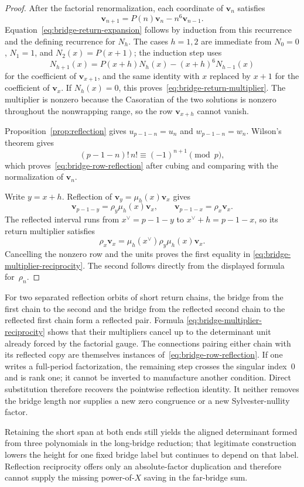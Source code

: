 \begin{proof}
After the factorial renormalization, each coordinate of $\mathbf v_n$
satisfies
\[
 \mathbf v_{n+1}=P(n)\mathbf v_n-n^6\mathbf v_{n-1}.
\]
Equation~\eqref{eq:bridge-return-expansion} follows by induction from this
recurrence and the defining recurrence for $N_h$.  The cases $h=1,2$ are
immediate from $N_0=0$, $N_1=1$, and $N_2(x)=P(x+1)$; the induction step
uses
\[
 N_{h+1}(x)=P(x+h)N_h(x)-(x+h)^6N_{h-1}(x)
\]
for the coefficient of $\mathbf v_{x+1}$, and the same identity with
$x$ replaced by $x+1$ for the coefficient of $\mathbf v_x$.
If $N_h(x)=0$, this proves~\eqref{eq:bridge-return-multiplier}.
The multiplier is nonzero because the Casoratian of the two solutions is
nonzero throughout the nonwrapping range, so the row $\mathbf v_{x+h}$
cannot vanish.

Proposition~\ref{prop:reflection} gives
$u_{p-1-n}=u_n$ and $w_{p-1-n}=w_n$.  Wilson's theorem gives
\[
 (p-1-n)!\,n!\equiv(-1)^{n+1}\pmod p,
\]
which proves~\eqref{eq:bridge-row-reflection} after cubing and comparing
with the normalization of $\mathbf v_n$.

Write $y=x+h$.  Reflection of
$\mathbf v_y=\mu_h(x)\mathbf v_x$ gives
\[
 \mathbf v_{p-1-y}=\rho_y\mu_h(x)\mathbf v_x,
 \qquad
 \mathbf v_{p-1-x}=\rho_x\mathbf v_x.
\]
The reflected interval runs from $x^\vee=p-1-y$ to
$x^\vee+h=p-1-x$, so its return multiplier satisfies
\[
 \rho_x\mathbf v_x
 =\mu_h(x^\vee)\rho_y\mu_h(x)\mathbf v_x.
\]
Cancelling the nonzero row and the units proves the first equality in
\eqref{eq:bridge-multiplier-reciprocity}.  The second follows directly
from the displayed formula for~$\rho_n$.
\end{proof}

\begin{remark}
\label{rem:bridge-full-cycle-tautology}
For two separated reflection orbits of short return chains, the bridge from
the first chain to the second and the bridge from the reflected second chain
to the reflected first chain form a reflected pair.  Formula
\eqref{eq:bridge-multiplier-reciprocity} shows that their multipliers
cancel up to the determinant unit already forced by the factorial gauge.
The connections pairing either chain with its reflected copy are themselves
instances of~\eqref{eq:bridge-row-reflection}.  If one writes a full-period
factorization, the remaining step crosses the singular index~$0$ and is
rank one; it cannot be inverted to manufacture another condition.  Direct
substitution therefore recovers the pointwise reflection identity.  It
neither removes the bridge length nor supplies a new zero congruence or a
new Sylvester-nullity factor.

Retaining the short span at both ends still yields the aligned determinant
formed from three polynomials in the long-bridge reduction; that
legitimate construction lowers the height for one fixed bridge label but
continues to depend on that label.  Reflection reciprocity offers only an
absolute-factor duplication and therefore cannot supply the missing
power-of-$X$ saving in the far-bridge sum.
\end{remark}

